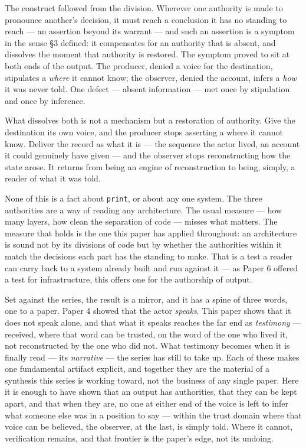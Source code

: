 \documentclass[
]{article}
\begin{document}
The construct followed from the division. Wherever one authority is made
to pronounce another's decision, it must reach a conclusion it has no
standing to reach --- an assertion beyond its warrant --- and such an
assertion is a symptom in the sense §3 defined: it compensates for an
authority that is absent, and dissolves the moment that authority is
restored. The symptom proved to sit at both ends of the output. The
producer, denied a voice for the destination, stipulates a \emph{where}
it cannot know; the observer, denied the account, infers a \emph{how} it
was never told. One defect --- absent information --- met once by
stipulation and once by inference.

What dissolves both is not a mechanism but a restoration of authority.
Give the destination its own voice, and the producer stops asserting a
where it cannot know. Deliver the record as what it is --- the sequence
the actor lived, an account it could genuinely have given --- and the
observer stops reconstructing how the state arose. It returns from being
an engine of reconstruction to being, simply, a reader of what it was
told.

None of this is a fact about \texttt{print}, or about any one system.
The three authorities are a way of reading any architecture. The usual
measure --- how many layers, how clean the separation of code --- misses
what matters. The measure that holds is the one this paper has applied
throughout: an architecture is sound not by its divisions of code but by
whether the authorities within it match the decisions each part has the
standing to make. That is a test a reader can carry back to a system
already built and run against it --- as Paper 6 offered a test for
infrastructure, this offers one for the authorship of output.

Set against the series, the result is a mirror, and it has a spine of
three words, one to a paper. Paper 4 showed that the actor
\emph{speaks}. This paper shows that it does not speak alone, and that
what it speaks reaches the far end as \emph{testimony} --- received,
where that word can be trusted, on the word of the one who lived it, not
reconstructed by the one who did not. What testimony becomes when it is
finally read --- its \emph{narrative} --- the series has still to take
up. Each of these makes one fundamental artifact explicit, and together
they are the material of a synthesis this series is working toward, not
the business of any single paper. Here it is enough to have shown that
an output has authorities, that they can be kept apart, and that when
they are, no one at either end of the voice is left to infer what
someone else was in a position to say --- within the trust domain where
that voice can be believed, the observer, at the last, is simply told.
Where it cannot, verification remains, and that frontier is the paper's
edge, not its undoing.
\end{document}
